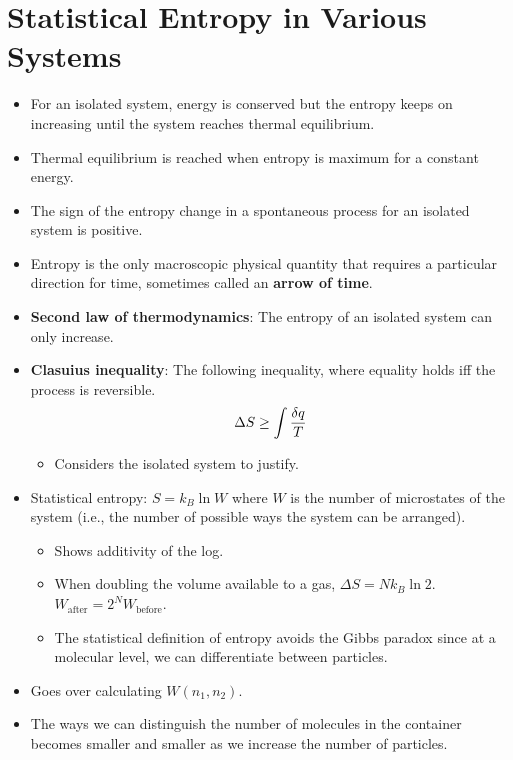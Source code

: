 \documentclass[../notes.tex]{subfiles}
\begin{document}
\section{Statistical Entropy in Various Systems}
\begin{itemize}
    \item {}For an isolated system, energy is conserved but the entropy keeps on increasing until the system reaches thermal equilibrium.
    \item Thermal equilibrium is reached when entropy is maximum for a constant energy.
    \item The sign of the entropy change in a spontaneous process for an isolated system is positive.
    \item Entropy is the only macroscopic physical quantity that requires a particular direction for time, sometimes called an \textbf{arrow of time}.
    \item \textbf{Second law of thermodynamics}: The entropy of an isolated system can only increase.
    \item \textbf{Clasuius inequality}: The following inequality, where equality holds iff the process is reversible.
    \begin{equation*}
        \Delta S \geq \int\frac{\var{q}}{T}
    \end{equation*}
    \begin{itemize}
        \item Considers the isolated system to justify.
    \end{itemize}
    \item Statistical entropy: $S=k_B\ln W$ where $W$ is the number of microstates of the system (i.e., the number of possible ways the system can be arranged).
    \begin{itemize}
        \item Shows additivity of the log.
        \item When doubling the volume available to a gas, $\Delta S = Nk_B\ln 2$. $W_\text{after}=2^NW_\text{before}$.
        \item The statistical definition of entropy avoids the Gibbs paradox since at a molecular level, we can differentiate between particles.
    \end{itemize}
    \item Goes over calculating $W(n_1,n_2)$.
    \item The ways we can distinguish the number of molecules in the container becomes smaller and smaller as we increase the number of particles.

\end{itemize}
\end{document}
